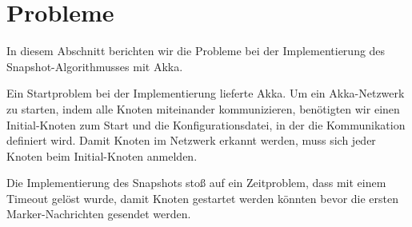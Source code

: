 \section{Probleme}
\label{sec:probs}
In diesem Abschnitt berichten wir die Probleme bei der Implementierung des
Snapshot-Algorithmusses mit Akka.

Ein Startproblem bei der Implementierung lieferte Akka.
Um ein Akka-Netzwerk zu starten, indem alle Knoten miteinander kommunizieren,
benötigten wir einen Initial-Knoten zum Start und die Konfigurationsdatei, in
der die Kommunikation definiert wird.
Damit Knoten im Netzwerk erkannt werden, muss sich jeder Knoten beim
Initial-Knoten anmelden.

Die Implementierung des Snapshots stoß auf ein Zeitproblem, dass mit einem
Timeout gelöst wurde, damit Knoten gestartet werden könnten bevor die ersten
Marker-Nachrichten gesendet werden.
